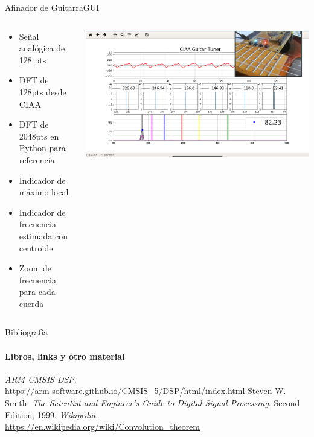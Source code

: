 \begin{frame}[t]{Afinador de Guitarra}{GUI}
   \footnotesize
   \begin{columns}
      \begin{column}{.3\textwidth}
         \begin{itemize}
            \item{Señal analógica de 128 pts}
            \item{DFT de 128pts desde CIAA}
            \item{DFT de 2048pts en Python para referencia}
            \item{Indicador de máximo local}
            \item{Indicador de frecuencia estimada con centroide}
            \item{Zoom de frecuencia para cada cuerda}
         \end{itemize}
      \end{column}
      \begin{column}{.7\textwidth}
       \href{run:./7_clase/demo.mp4}{
         \includegraphics[width=1.0\textwidth]{7_clase/tuner2}
       }
      \end{column}
   \end{columns}
   \vfill
   \note{
      \begin{itemize}
         \item{}
         \item{}
      \end{itemize}
   }
\end{frame}
\begin{frame}{Bibliografía}
   \framesubtitle{Libros, links y otro material}
   \begin{thebibliography}{9}
         \emph{ARM CMSIS DSP}. \\
         \href {https://arm-software.github.io/CMSIS_5/DSP/html/index.html}{https://arm-software.github.io/CMSIS\_5/DSP/html/index.html}
         Steven W. Smith.
         \emph{The Scientist and Engineer's Guide to Digital Signal Processing}.
         Second Edition, 1999.
         \emph{Wikipedia}. \\
         \href {https://en.wikipedia.org/wiki/Convolution\_theorem}{https://en.wikipedia.org/wiki/Convolution\_theorem}
   \end{thebibliography}
\end{frame}
